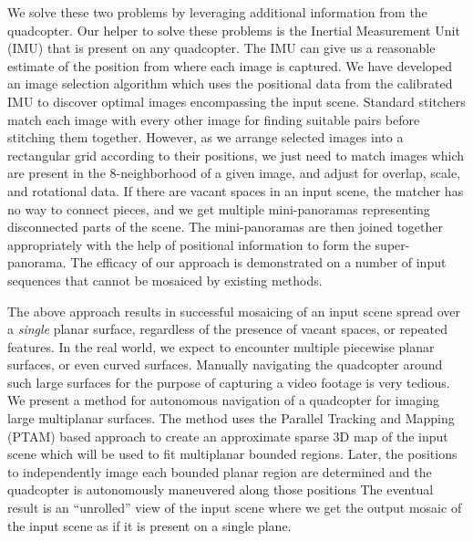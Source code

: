 We solve these two problems by leveraging additional information from the quadcopter.
Our helper to solve these problems is the Inertial Measurement Unit (IMU) that
is present on any quadcopter. The IMU can give us a reasonable estimate of
the position from where each image is captured. We have developed an image selection
algorithm which uses the positional data from the calibrated IMU to discover optimal
images encompassing the input scene. Standard stitchers match each image
with every other image for finding suitable pairs before stitching them
together. However, as we arrange selected images into a rectangular grid
according to their positions, we just need to match images which are present in
the 8-neighborhood of a given image, and adjust for overlap, scale, and rotational data.
If there are vacant spaces in an input scene, the matcher has no way to connect pieces, and we  get multiple mini-panoramas representing disconnected parts of the scene. The mini-panoramas are then joined together appropriately with the help of positional information to form the super-panorama. The efficacy of our approach is demonstrated on a number of input sequences that cannot be mosaiced by existing methods.

The above approach results in successful mosaicing of an input scene spread over
a \emph{single} planar surface, regardless of the presence of vacant spaces, or repeated features. In the real world, we expect to  encounter multiple piecewise planar surfaces, or even curved surfaces. Manually navigating the quadcopter around such large surfaces for the purpose of capturing a video footage is 
very tedious. We present a method for autonomous
navigation of a quadcopter for imaging large multiplanar surfaces. The method
uses the Parallel Tracking and Mapping (PTAM) based approach to create an 
approximate sparse 3D map of the input scene which will be used to fit
multiplanar bounded regions. Later, the positions to independently image each bounded planar region
are determined and the quadcopter is autonomously maneuvered along those positions
The eventual result is an ``unrolled'' view of the input scene where we
get the output mosaic of the input scene as if it is present on a single plane.

